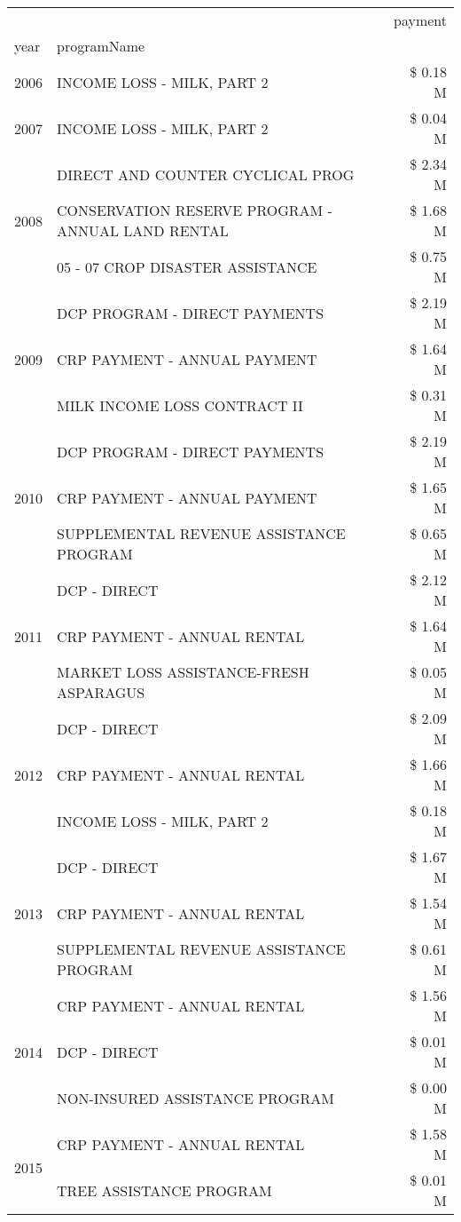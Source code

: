\begin{tabular}{llr}
\toprule
 &  & payment \\
year & programName &  \\
\midrule
2006 & INCOME LOSS - MILK, PART 2 & \$ 0.18 M \\
\cline{1-3}
2007 & INCOME LOSS - MILK, PART 2 & \$ 0.04 M \\
\cline{1-3}
\multirow[t]{3}{*}{2008} & DIRECT AND COUNTER CYCLICAL PROG & \$ 2.34 M \\
 & CONSERVATION RESERVE PROGRAM - ANNUAL LAND RENTAL & \$ 1.68 M \\
 & 05 - 07 CROP DISASTER ASSISTANCE & \$ 0.75 M \\
\cline{1-3}
\multirow[t]{3}{*}{2009} & DCP PROGRAM - DIRECT PAYMENTS & \$ 2.19 M \\
 & CRP PAYMENT - ANNUAL PAYMENT & \$ 1.64 M \\
 & MILK INCOME LOSS CONTRACT II & \$ 0.31 M \\
\cline{1-3}
\multirow[t]{3}{*}{2010} & DCP PROGRAM - DIRECT PAYMENTS & \$ 2.19 M \\
 & CRP PAYMENT - ANNUAL PAYMENT & \$ 1.65 M \\
 & SUPPLEMENTAL REVENUE ASSISTANCE PROGRAM & \$ 0.65 M \\
\cline{1-3}
\multirow[t]{3}{*}{2011} & DCP - DIRECT & \$ 2.12 M \\
 & CRP PAYMENT - ANNUAL RENTAL & \$ 1.64 M \\
 & MARKET LOSS ASSISTANCE-FRESH ASPARAGUS & \$ 0.05 M \\
\cline{1-3}
\multirow[t]{3}{*}{2012} & DCP - DIRECT & \$ 2.09 M \\
 & CRP PAYMENT - ANNUAL RENTAL & \$ 1.66 M \\
 & INCOME LOSS - MILK, PART 2 & \$ 0.18 M \\
\cline{1-3}
\multirow[t]{3}{*}{2013} & DCP - DIRECT & \$ 1.67 M \\
 & CRP PAYMENT - ANNUAL RENTAL & \$ 1.54 M \\
 & SUPPLEMENTAL REVENUE ASSISTANCE PROGRAM & \$ 0.61 M \\
\cline{1-3}
\multirow[t]{3}{*}{2014} & CRP PAYMENT - ANNUAL RENTAL & \$ 1.56 M \\
 & DCP - DIRECT & \$ 0.01 M \\
 & NON-INSURED ASSISTANCE PROGRAM & \$ 0.00 M \\
\cline{1-3}
\multirow[t]{2}{*}{2015} & CRP PAYMENT - ANNUAL RENTAL & \$ 1.58 M \\
 & TREE ASSISTANCE PROGRAM & \$ 0.01 M \\

\end{tabular}
